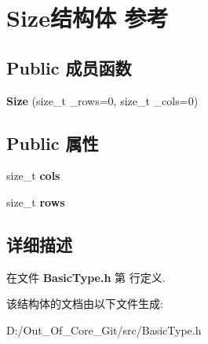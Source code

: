 \section{Size结构体 参考}
\label{struct_size}
\subsection*{Public 成员函数}
\begin{DoxyCompactItemize}
\item 
{\bfseries Size} (size\-\_\-t \-\_\-rows=0, size\-\_\-t \-\_\-cols=0)\label{struct_size_a9ca4538e296801bc1e621bfa3d79bf10}

\end{DoxyCompactItemize}
\subsection*{Public 属性}
\begin{DoxyCompactItemize}
\item 
size\-\_\-t {\bfseries cols}\label{struct_size_ad15cd5d15d1cc0cf43dcbae748484237}

\item 
size\-\_\-t {\bfseries rows}\label{struct_size_add52bc013a38bb9089daf65a16341b7f}

\end{DoxyCompactItemize}


\subsection{详细描述}


在文件 {\bf Basic\-Type.\-h} 第  行定义.



该结构体的文档由以下文件生成\-:\begin{DoxyCompactItemize}
\item 
D\-:/\-Out\-\_\-\-Of\-\_\-\-Core\-\_\-\-Git/src/Basic\-Type.\-h\end{DoxyCompactItemize}
